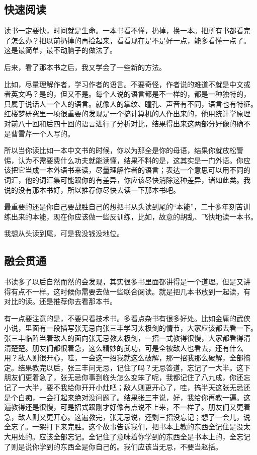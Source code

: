 \documentclass[10pt]{article}
\begin{document}
\begin{CJK*}{UTF8}{simsun}
\subsection{快速阅读}

读书一定要快，时间就是生命。一本书看不懂，扔掉，换一本。把所有书都看完
了怎么办？把以前扔掉的再捡起来，看看现在是不是好一点，能多看懂一点了。
这是最简单，最不动脑子的做法了。

后来，看了那本书之后，我又学会了一些新的方法。

比如，尽量理解作者，学习作者的语言。不要奇怪，作者说的难道不就是中文或
者英文吗？是的，但又不是。每个人说的语言都是不一样的，都是一种独特的，
只属于说话人一个人的语言。就像人的掌纹、瞳孔、声音有不同，语言也有特征。
红楼梦研究里一项很重要的发现是一个搞计算机的人作出来的，他用统计学原理
对前八十回和后四十回的语言进行了分析对比，结果得出来这两部分好像的确不
是曹雪芹一个人写的。

所以当你读比如一本中文书的时候，你以为那全是你的母语，结果你就放松警
惕，认为不需要费什么功夫就能读懂，结果不料的是，这其实是一门外语。你应
该把它当成一本外语书来读，尽量理解作者的语言；表达一个意思可以用不同的
词汇，他的词汇集可能跟你的有差异，你应该尽快消除这种差异，诸如此类。我
说的没有那本书好，所以推荐你尽快去读一下那本书吧。

最重要的还是你自己要战胜自己的想把书从头读到尾的“本能”，二十多年刻苦训
练出来的本能，现在你应该做一些反训练，比如，故意的胡乱、飞快地读一本书。

我想从头读到尾，可是我没钱没地位。

\subsection{融会贯通}

书读多了以后自然而然的会发现，其实很多书里面都讲得是一个道理。但是又讲
得有点不一样。这时候你需要去做一些联合阅读。就是把几本书放到一起读，有
对比的读。还是推荐你去看那本书。

有一点要注意的是，不要只看技术书。多看点杂书有很多好处。比如金庸的武侠
小说，里面有一段描写张无忌向张三丰学习太极剑的情节，大家应该都去看一下。
张三丰临阵当着敌人的面向张无忌教太极剑，一招一式教得很慢，大家都看得清
清楚楚。朋友们都很着急，这么精妙的武功，可是全被敌人也看去，还有什么
用？敌人则很开心，哇，一会这一招我就这么破解，那一招我那么破解，全部搞
定。结果教完以后，张三丰问无忌，记住了吗？无忌答道，忘记了一大半。这下
朋友们更着急了，张无忌你事到临头怎么变笨了呢，我都记住了八九成，你还忘
记了一大半，要不我给你开开小灶吧；敌人则更开心了，哇，搞半天这张无忌还
是个白痴，一会打起来绝对没问题了。结果张三丰说，好，我给你再教一遍。这
遍教得还是很慢，可是招式跟刚才好像有点说不上来，不一样了。朋友们又更着
急，敌人则又更开心。这遍教完，张无忌说，还剩三招没忘记；想了一会儿，说
全忘了。一架打下来完胜。这个故事告诉我们，把书本上教的东西全记住是没太
大用处的。应该全部忘记。全记住了意味着你学到的东西全是书本上的，全忘记
了则是说你学到的东西全是你自己的。我们应该当无忌，不要当赵括。


\end{CJK*}
\end{document}
